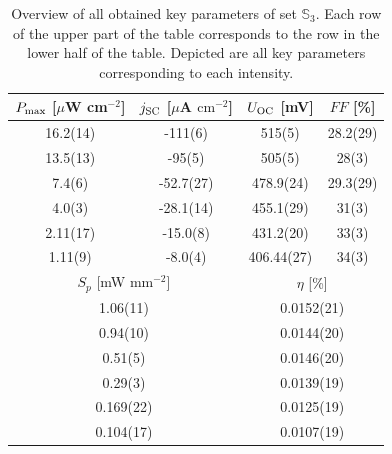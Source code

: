\documentclass[a4paper,10pt,twocolumn]{article}
\begin{document}
\begin{extract*}
\begin{table}[ht]
	\caption{Overview of all obtained key parameters of set $\mathbb{S}_3$. Each row of the upper part of the table corresponds to the row in the lower half of the table. Depicted are all key parameters corresponding to each intensity.}
	\label{tab:OSC3table}
	\begin{tabular}{@{}cccc@{}}
		\toprule
		$P_{\text{max}}$ [$\mu$W cm$^{-2}$] & $j_{\text{SC}}$ [$\mu$A $\mathrm{cm}^{-2}$] & $U_{\text{OC}}$ [mV]     & $FF$ [\%]     \\ \midrule
		16.2(14)                   & -111(6)                            & 515(5)          & 28.2(29)      \\
		13.5(13)                   & -95(5)                             & 505(5)          & 28(3)         \\
		7.4(6)                     & -52.7(27)                          & 478.9(24)       & 29.3(29)      \\
		4.0(3)                     & -28.1(14)                          & 455.1(29)       & 31(3)         \\
		2.11(17)                   & -15.0(8)                           & 431.2(20)       & 33(3)         \\
		1.11(9)                    & -8.0(4)                            & 406.44(27)      & 34(3)         \\ \midrule
		\multicolumn{2}{c}{$S_p$ [mW mm$^{-2}$]}                        & \multicolumn{2}{c}{$\eta$ [\%]} \\ \midrule
		\multicolumn{2}{c}{1.06(11)}                                    & \multicolumn{2}{c}{0.0152(21)}  \\
		\multicolumn{2}{c}{0.94(10)}                                    & \multicolumn{2}{c}{0.0144(20)}  \\
		\multicolumn{2}{c}{0.51(5)}                                     & \multicolumn{2}{c}{0.0146(20)}  \\
		\multicolumn{2}{c}{0.29(3)}                                     & \multicolumn{2}{c}{0.0139(19)}  \\
		\multicolumn{2}{c}{0.169(22)}                                   & \multicolumn{2}{c}{0.0125(19)}  \\
		\multicolumn{2}{c}{0.104(17)}                                   & \multicolumn{2}{c}{0.0107(19)}  \\ \bottomrule
	\end{tabular}
\end{table}


\end{extract*}
\end{document}
